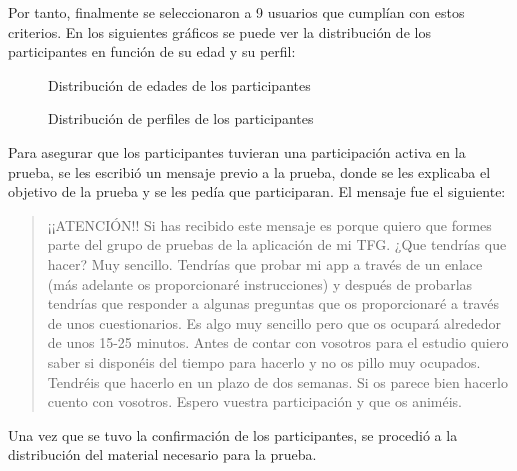 Por tanto, finalmente se seleccionaron a 9 usuarios que cumplían con estos criterios. 
En los siguientes gráficos se puede ver la distribución de los participantes en función de su edad y su perfil: 

\begin{figure}[H]
    \centering
    \caption{Distribución de edades de los participantes}
    \label{fig:edades-participantes}
\end{figure}

\begin{figure}[H]
    \centering
    \caption{Distribución de perfiles de los participantes}
    \label{fig:perfiles-participantes}
\end{figure}

Para asegurar que los participantes tuvieran una participación activa en la prueba, 
se les escribió un mensaje previo a la prueba, donde se les explicaba el objetivo de la prueba y se les pedía que participaran.
El mensaje fue el siguiente:

\begin{quote}
¡¡ATENCIÓN!!  
Si has recibido este mensaje es porque quiero que formes parte del grupo de pruebas de la aplicación de mi TFG. ¿Que tendrías que hacer? Muy sencillo. Tendrías que probar mi app a través de un enlace (más adelante os proporcionaré instrucciones) y después de probarlas tendrías que responder a algunas preguntas que os proporcionaré a través de unos cuestionarios. 
Es algo muy sencillo pero que os ocupará alrededor de unos 15-25 minutos. Antes de contar con vosotros para el estudio quiero saber si disponéis del tiempo para hacerlo y no os pillo muy ocupados. 
Tendréis que hacerlo en un plazo de dos semanas. Si os parece bien hacerlo cuento con vosotros. Espero vuestra participación y que os animéis. 

\end{quote}

Una vez que se tuvo la confirmación de los participantes, se procedió a la distribución del material necesario para la prueba.


